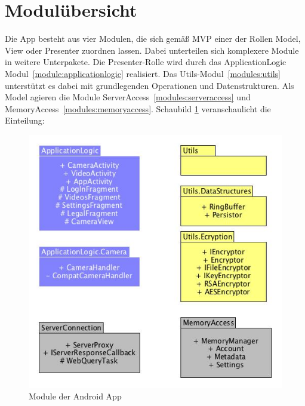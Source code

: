 \section{Modulübersicht}
Die App besteht aus vier Modulen, die sich gemäß MVP einer der Rollen Model, View oder Presenter zuordnen lassen. Dabei unterteilen sich komplexere Module in weitere Unterpakete. Die Presenter-Rolle wird durch das ApplicationLogic Modul~\eqref{module:applicationlogic} realisiert. Das Utils-Modul~\eqref{modules:utils} unterstützt es dabei mit grundlegenden Operationen und Datenstrukturen. Als Model agieren die Module ServerAccess~\eqref{modules:serveraccess} und MemoryAccess~\eqref{modules:memoryaccess}. Schaubild \ref{fig:modules_overview} veranschaulicht die Einteilung:
\begin{figure}[ht]
	\centering
\includegraphics[width=1\textwidth]{./resources/Diagramme/App/modules_overview.jpg}
\caption{Module der Android App}
	\label{fig:modules_overview}
\end{figure}
\newpage

\newpage

\newpage

\newpage

